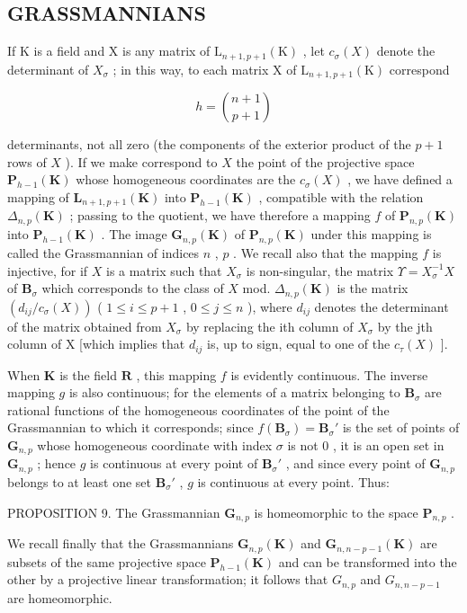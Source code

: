 \subsection{GRASSMANNIANS}

If K is a field and X is any matrix of \(\mathrm{L}_{n+1,p+1}(\mathrm{K})\) , let \(c_{\sigma}(X)\) denote the determinant of \(X_{\sigma}\) ; in this way, to each matrix X of \(\mathrm{L}_{n+1,p+1}(\mathrm{K})\) correspond

\[
h = \binom {n + 1} {p + 1}
\]

determinants, not all zero (the components of the exterior product of the \(p + 1\) rows of \(X\) ). If we make correspond to \(X\) the point of the projective space \(\mathbf{P}_{h-1}(\mathbf{K})\) whose homogeneous coordinates are the \(c_{\sigma}(X)\) , we have defined a mapping of \(\mathbf{L}_{n+1,p+1}(\mathbf{K})\) into \(\mathbf{P}_{h-1}(\mathbf{K})\) , compatible with the relation \(\Delta_{n,p}(\mathbf{K})\) ; passing to the quotient, we have therefore a mapping \(f\) of \(\mathbf{P}_{n,p}(\mathbf{K})\) into \(\mathbf{P}_{h-1}(\mathbf{K})\) . The image \(\mathbf{G}_{n,p}(\mathbf{K})\) of \(\mathbf{P}_{n,p}(\mathbf{K})\) under this mapping is called the Grassmannian of indices \(n\) , \(p\) . We recall also that the mapping \(f\) is injective, for if \(X\) is a matrix such that \(X_{\sigma}\) is non-singular, the matrix \(\Upsilon = X_{\sigma}^{-1}X\) of \(\mathbf{B}_{\sigma}\) which corresponds to the class of \(X\) mod. \(\Delta_{n,p}(\mathbf{K})\) is the matrix \((d_{ij}/c_{\sigma}(X))\) ( \(1 \leqslant i \leqslant p + 1\) , \(0 \leqslant j \leqslant n\) ), where \(d_{ij}\) denotes the determinant of the matrix obtained from \(X_{\sigma}\) by replacing the ith column of \(X_{\sigma}\) by the jth column of X {[}which implies that \(d_{ij}\) is, up to sign, equal to one of the \(c_{\tau}(X)\) {]}.

When \(\mathbf{K}\) is the field \(\mathbf{R}\) , this mapping \(f\) is evidently continuous. The inverse mapping \(g\) is also continuous; for the elements of a matrix belonging to \(\mathbf{B}_{\sigma}\) are rational functions of the homogeneous coordinates of the point of the Grassmannian to which it corresponds; since \(f(\mathbf{B}_{\sigma}) = \mathbf{B}_{\sigma}'\) is the set of points of \(\mathbf{G}_{n,p}\) whose homogeneous coordinate with index \(\sigma\) is not \(0\) , it is an open set in \(\mathbf{G}_{n,p}\) ; hence \(g\) is continuous at every point of \(\mathbf{B}_{\sigma}'\) , and since every point of \(\mathbf{G}_{n,p}\) belongs to at least one set \(\mathbf{B}_{\sigma}'\) , \(g\) is continuous at every point. Thus:

PROPOSITION 9. The Grassmannian \(\mathbf{G}_{n,p}\) is homeomorphic to the space \(\mathbf{P}_{n,p}\) .

We recall finally that the Grassmannians \(\mathbf{G}_{n,p}(\mathbf{K})\) and \(\mathbf{G}_{n,n-p-1}(\mathbf{K})\) are subsets of the same projective space \(\mathbf{P}_{h-1}(\mathbf{K})\) and can be transformed into the other by a projective linear transformation; it follows that \(G_{n,p}\) and \(G_{n,n-p-1}\) are homeomorphic.
\relax{}
\ExerciseGroupsStart
